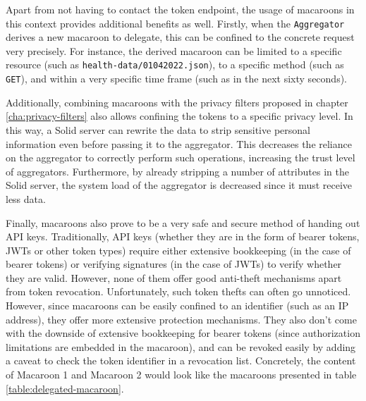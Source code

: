 Apart from not having to contact the token endpoint, the usage of macaroons in this context provides additional benefits as well. 
Firstly, when the \texttt{Aggregator} derives a new macaroon to delegate, this can be confined to the concrete request very precisely. For instance, the derived macaroon can be limited to a specific resource (such as \texttt{health-data/01042022.json}), to a specific method (such as \texttt{GET}), and within a very specific time frame (such as in the next sixty seconds). 

Additionally, combining macaroons with the privacy filters proposed in chapter \ref{cha:privacy-filters} also allows confining the tokens to a specific privacy level. In this way, a Solid server can rewrite the data to strip sensitive personal information even before passing it to the aggregator. This decreases the reliance on the aggregator to correctly perform such operations, increasing the trust level of aggregators. Furthermore, by already stripping a number of attributes in the Solid server, the system load of the aggregator is decreased since it must receive less data.

Finally, macaroons also prove to be a very safe and secure method of handing out API keys. Traditionally, API keys (whether they are in the form of bearer tokens, \gls{JWT}s or other token types) require either extensive bookkeeping (in the case of bearer tokens) or verifying signatures (in the case of \gls{JWT}s) to verify whether they are valid. However, none of them offer good anti-theft mechanisms apart from token revocation. Unfortunately, such token thefts can often go unnoticed. However, since macaroons can be easily confined to an identifier (such as an IP address), they offer more extensive protection mechanisms. They also don't come with the downside of extensive bookkeeping for bearer tokens (since authorization limitations are embedded in the macaroon), and can be revoked easily by adding a caveat to check the token identifier in a revocation list. Concretely, the content of Macaroon 1 and Macaroon 2 would look like the macaroons presented in table \ref{table:delegated-macaroon}.

